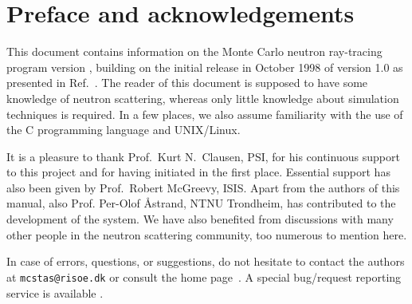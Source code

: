 
\chapter*{Preface and acknowledgements}
This document contains information on the Monte Carlo neutron
ray-tracing program \MCS version \version, building on the initial
release in October 1998 of version 1.0 as presented in Ref.~\cite{nn_10_20}. The reader of this
document is supposed to have some knowledge of neutron scattering,
whereas only little knowledge about simulation techniques is
required. In a few places, we also assume familiarity with the
use of the C programming language and UNIX/Linux.

It is a pleasure to thank Prof.~Kurt N.~Clausen, PSI, for his continuous
support to this project and for having initiated \MCS in the first
place. Essential support has also been given by Prof.~Robert McGreevy, ISIS.
Apart from the authors of this manual, also Prof. Per-Olof \AA strand, NTNU Trondheim,
has contributed to the development of the \MCS system.
We have also benefited
from discussions with many other people in the neutron scattering
community, too numerous to mention here.


In case of errors, questions, or suggestions,
do not hesitate to
contact the authors at \verb+mcstas@risoe.dk+
or consult the \MCS home page~\cite{mcstas_webpage}.
A special bug/request reporting service is available \cite{mczilla_webpage}.

